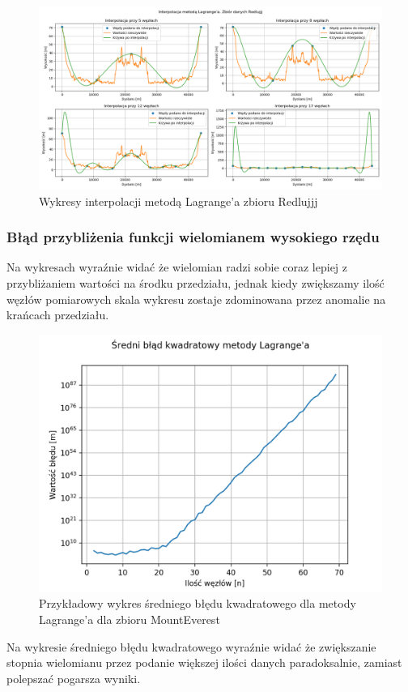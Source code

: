 \documentclass{article} %
\begin{document}
\begin{figure}[H]
    \centering
    \includegraphics[scale=0.42]{../plots/lagrange_Redlujjj.png}
    \caption{Wykresy interpolacji metodą Lagrange'a zbioru Redlujjj}
\end{figure}

\subsubsection{Błąd przybliżenia funkcji wielomianem wysokiego rzędu}
Na wykresach wyraźnie widać że wielomian radzi sobie coraz lepiej z przybliżaniem wartości na środku przedziału, jednak kiedy zwiększamy ilość węzłów pomiarowych skala wykresu zostaje zdominowana przez anomalie na krańcach przedziału.
\begin{figure}[H]
    \centering
    \includegraphics[scale=0.8]{../plots/error_lagrange_MountEverest.png}
    \caption{Przykładowy wykres średniego błędu kwadratowego dla metody Lagrange'a dla zbioru MountEverest}
\end{figure}
Na wykresie średniego błędu kwadratowego wyraźnie widać że zwiększanie stopnia wielomianu przez podanie większej ilości danych paradoksalnie, zamiast polepszać pogarsza wyniki.
\end{document}

